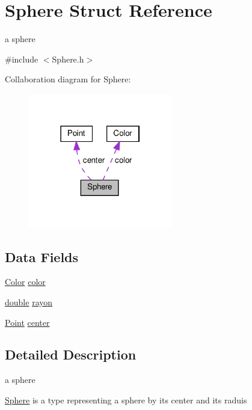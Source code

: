 \hypertarget{struct_sphere}{}\section{Sphere Struct Reference}
\label{struct_sphere}


a sphere  




{\ttfamily \#include $<$Sphere.\+h$>$}



Collaboration diagram for Sphere\+:\nopagebreak
\begin{figure}[H]
\begin{center}
\leavevmode
\includegraphics[width=178pt]{struct_sphere__coll__graph}
\end{center}
\end{figure}
\subsection*{Data Fields}
\begin{DoxyCompactItemize}
\item 
\hyperlink{struct_color}{Color} \hyperlink{struct_sphere_aa5f4d1eda21c196bd8401ff73f105073}{color}
\item 
\hyperlink{g3x__transfo_8h_a89b2b23e407882a535d835574a7912e1}{double} \hyperlink{struct_sphere_a2459aedac9f8646ad9566164a9a83f41}{rayon}
\item 
\hyperlink{struct_point}{Point} \hyperlink{struct_sphere_a24bb1c337bce91dd3e7a4a4372b11793}{center}
\end{DoxyCompactItemize}


\subsection{Detailed Description}
a sphere 

\hyperlink{struct_sphere}{Sphere} is a type representing a sphere by its center and its raduis 

